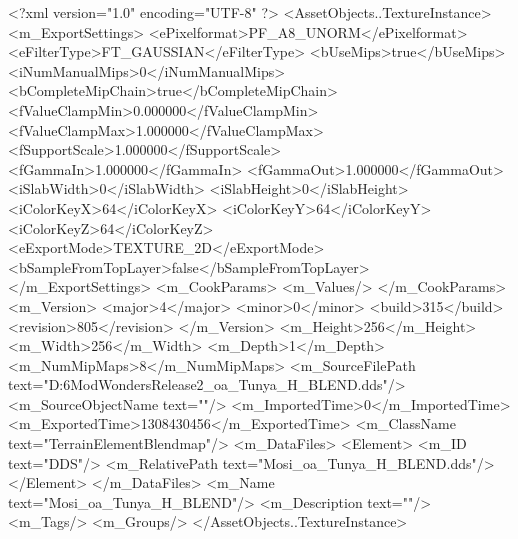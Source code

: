 <?xml version="1.0" encoding="UTF-8" ?>
<AssetObjects..TextureInstance>
	<m_ExportSettings>
		<ePixelformat>PF_A8_UNORM</ePixelformat>
		<eFilterType>FT_GAUSSIAN</eFilterType>
		<bUseMips>true</bUseMips>
		<iNumManualMips>0</iNumManualMips>
		<bCompleteMipChain>true</bCompleteMipChain>
		<fValueClampMin>0.000000</fValueClampMin>
		<fValueClampMax>1.000000</fValueClampMax>
		<fSupportScale>1.000000</fSupportScale>
		<fGammaIn>1.000000</fGammaIn>
		<fGammaOut>1.000000</fGammaOut>
		<iSlabWidth>0</iSlabWidth>
		<iSlabHeight>0</iSlabHeight>
		<iColorKeyX>64</iColorKeyX>
		<iColorKeyY>64</iColorKeyY>
		<iColorKeyZ>64</iColorKeyZ>
		<eExportMode>TEXTURE_2D</eExportMode>
		<bSampleFromTopLayer>false</bSampleFromTopLayer>
	</m_ExportSettings>
	<m_CookParams>
		<m_Values/>
	</m_CookParams>
	<m_Version>
		<major>4</major>
		<minor>0</minor>
		<build>315</build>
		<revision>805</revision>
	</m_Version>
	<m_Height>256</m_Height>
	<m_Width>256</m_Width>
	<m_Depth>1</m_Depth>
	<m_NumMipMaps>8</m_NumMipMaps>
	<m_SourceFilePath text="D:\Civ6Mod\Terrain\NW\Natural Wonders\TM Release2\VictoriaFalls\Mosi_oa_Tunya_H_BLEND.dds"/>
	<m_SourceObjectName text=""/>
	<m_ImportedTime>0</m_ImportedTime>
	<m_ExportedTime>1308430456</m_ExportedTime>
	<m_ClassName text="TerrainElementBlendmap"/>
	<m_DataFiles>
		<Element>
			<m_ID text="DDS"/>
			<m_RelativePath text="Mosi_oa_Tunya_H_BLEND.dds"/>
		</Element>
	</m_DataFiles>
	<m_Name text="Mosi_oa_Tunya_H_BLEND"/>
	<m_Description text=""/>
	<m_Tags/>
	<m_Groups/>
</AssetObjects..TextureInstance>

